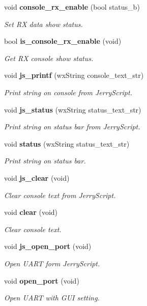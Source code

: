 \begin{DoxyCompactItemize}
void \textbf{ console\+\_\+rx\+\_\+enable} (bool status\+\_\+b)
\begin{DoxyCompactList}\small\item\em Set RX data show status. \end{DoxyCompactList}\item 
bool \textbf{ is\+\_\+console\+\_\+rx\+\_\+enable} (void)
\begin{DoxyCompactList}\small\item\em Get RX console show status. \end{DoxyCompactList}\item 
void \textbf{ js\+\_\+printf} (wx\+String console\+\_\+text\+\_\+str)
\begin{DoxyCompactList}\small\item\em Print string on console from Jerry\+Script. \end{DoxyCompactList}\item 
void \textbf{ js\+\_\+status} (wx\+String status\+\_\+text\+\_\+str)
\begin{DoxyCompactList}\small\item\em Print string on status bar from Jerry\+Script. \end{DoxyCompactList}\item 
void \textbf{ status} (wx\+String status\+\_\+text\+\_\+str)
\begin{DoxyCompactList}\small\item\em Print string on status bar. \end{DoxyCompactList}\item 
void \textbf{ js\+\_\+clear} (void)
\begin{DoxyCompactList}\small\item\em Clear console text from Jerry\+Script. \end{DoxyCompactList}\item 
void \textbf{ clear} (void)
\begin{DoxyCompactList}\small\item\em Clear console text. \end{DoxyCompactList}\item 
void \textbf{ js\+\_\+open\+\_\+port} (void)
\begin{DoxyCompactList}\small\item\em Open U\+A\+RT form Jerry\+Script. \end{DoxyCompactList}\item 
void \textbf{ open\+\_\+port} (void)
\begin{DoxyCompactList}\small\item\em Open U\+A\+RT with G\+UI setting. \end{DoxyCompactList}\item 

\end{DoxyCompactItemize}
